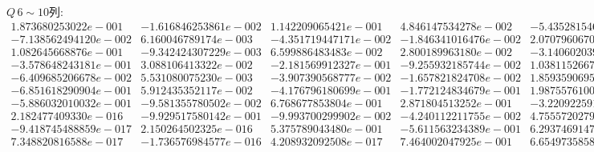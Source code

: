 \begin{landscape}
$Q\,6\sim 10$列:
\[
\begin{matrix}
1.873680253022e-001 & -1.616846253861e-002 & 1.142209065421e-001 & 4.846147534278e-002 & -5.435281546003e-002\\-7.138562494120e-002 & 6.160046789174e-003 & -4.351719447171e-002 & -1.846341016476e-002 & 2.070796067082e-002\\1.082645668876e-001 & -9.342424307229e-003 & 6.599886483483e-002 & 2.800189963180e-002 & -3.140602039975e-002\\-3.578648243181e-001 & 3.088106413322e-002 & -2.181569912327e-001 & -9.255932185744e-002 & 1.038115266702e-001\\-6.409685206678e-002 & 5.531080075230e-003 & -3.907390568777e-002 & -1.657821824708e-002 & 1.859359069582e-002\\-6.851618290904e-001 & 5.912435352117e-002 & -4.176796180699e-001 & -1.772124834679e-001 & 1.987557610042e-001\\-5.886032010032e-001 & -9.581355780502e-002 & 6.768677853804e-001 & 2.871804513252e-001 & -3.220922591440e-001\\2.182477409330e-016 & -9.929517580142e-001 & -9.993700299902e-002 & -4.240112211755e-002 & 4.755572027991e-002\\-9.418745488859e-017 & 2.150264502325e-016 & 5.375789043480e-001 & -5.611563234389e-001 & 6.293746914713e-001\\7.348820816588e-017 & -1.736576984577e-016 & 4.208932092508e-017 & 7.464002047925e-001 & 6.654973585866e-001\\
\end{matrix}\]


\end{landscape}
